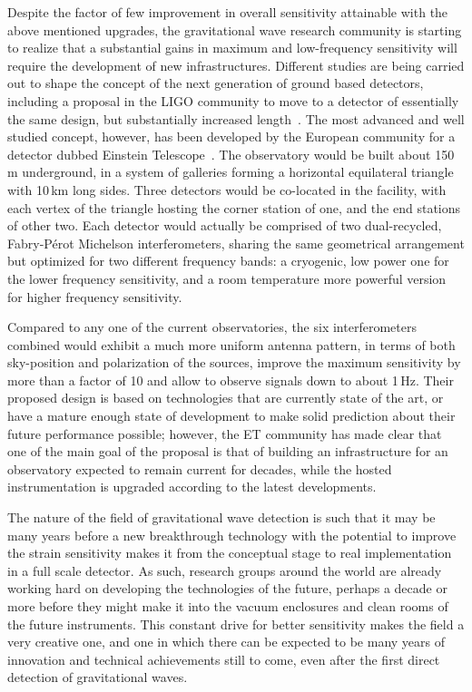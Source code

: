 Despite the factor of few improvement in overall sensitivity attainable with the above mentioned upgrades, the gravitational wave research community is starting to realize that a substantial gains in maximum and low-frequency sensitivity will require the development of new infrastructures. 
Different studies are being carried out to shape the concept of the next generation of ground based detectors, including a proposal in the LIGO community to move to a detector of essentially the same design, but substantially increased length~\cite{Dwyer2015}.
The most advanced and well studied concept, however, has been developed by the European community for a detector dubbed Einstein Telescope~\cite{Punturo2010}.
The observatory would be built about 150\,m underground, in a system of galleries forming a horizontal equilateral triangle with 10\,km long sides. Three detectors would be co-located in the facility, with each vertex of the triangle hosting the corner station of one, and the end stations of other two.
Each detector would actually be comprised of two dual-recycled, Fabry-P\'{e}rot Michelson  interferometers, sharing the same geometrical arrangement but optimized for two different frequency bands: a cryogenic, low power one for the lower frequency sensitivity, and a room temperature more powerful version for higher frequency sensitivity.

Compared to any one of the current observatories, the six interferometers combined would exhibit a much more uniform antenna pattern, in terms of both sky-position and polarization of the sources, improve the maximum sensitivity by more than a factor of 10 and allow to observe signals down to about 1\,Hz. 
Their proposed design is based on technologies that are currently state of the art, or have a mature enough state of development to make solid prediction about their future performance possible; however, the ET community has made clear that one of the main goal of the proposal is that of building an infrastructure for an observatory expected to remain current for decades, while the hosted instrumentation is upgraded according to the latest developments.

The nature of the field of gravitational wave detection is such that it may be many years before a new breakthrough technology with the potential to improve the strain sensitivity makes it from the conceptual stage to real implementation in a full scale detector. 
As such, research groups around the world are already working hard on developing the technologies of the future, perhaps a decade or more before they might make it into the vacuum enclosures and clean rooms of the future instruments. 
This constant drive for better sensitivity makes the field a very creative one, and one in which there can be expected to be many years of innovation and technical achievements still to come, even after the first direct detection of gravitational waves.